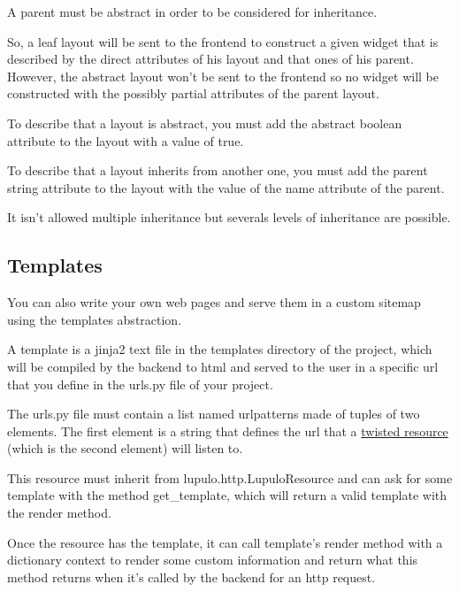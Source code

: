 \documentclass[12pt]{article}
\begin{document}
                A parent must be abstract in order to be considered for
                inheritance.

                So, a leaf layout will be sent to the frontend to construct a
                given widget that is described by the direct attributes of his
                layout and that ones of his parent. However, the abstract layout
                won't be sent to the frontend so no widget will be constructed
                with the possibly partial attributes of the parent layout.

                To describe that a layout is abstract, you must add the abstract
                boolean attribute to the layout with a value of true.

                To describe that a layout inherits from another one, you must
                add the parent string attribute to the layout with the value of
                the name attribute of the parent.

                It isn't allowed multiple inheritance but severals levels of
                inheritance are possible.
            
        \subsection{Templates}
            You can also write your own web pages and serve them in a custom
            sitemap using the templates abstraction.

            A template is a jinja2 text file in the templates directory of the
            project, which will be compiled by the backend to html and served to
            the user in a specific url that you define in the urls.py file of
            your project.

            The urls.py file must contain a list named urlpatterns made of
            tuples of two elements. The first element is a string that defines
            the url that a
            \href{https://twistedmatrix.com/documents/15.0.0/web/howto/using-twistedweb.html#resource-objects}{twisted resource}
            (which is the second element) will listen to.

            This resource must inherit from lupulo.http.LupuloResource and can
            ask for some template with the method get\_template, which will
            return a valid template with the render method.

            Once the resource has the template, it can call template's render
            method with a dictionary context to render some custom information
            and return what this method returns when it's called by the backend
            for an http request.
\end{document}
